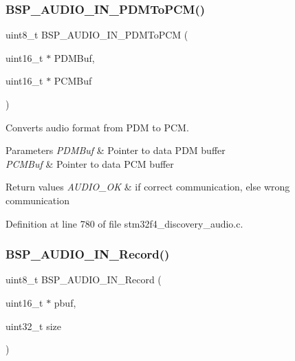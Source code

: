 \subsubsection{\texorpdfstring{B\+S\+P\+\_\+\+A\+U\+D\+I\+O\+\_\+\+I\+N\+\_\+\+P\+D\+M\+To\+P\+C\+M()}{BSP\_AUDIO\_IN\_PDMToPCM()}}
{\footnotesize\ttfamily uint8\+\_\+t B\+S\+P\+\_\+\+A\+U\+D\+I\+O\+\_\+\+I\+N\+\_\+\+P\+D\+M\+To\+P\+CM (\begin{DoxyParamCaption}\item[{uint16\+\_\+t $\ast$}]{P\+D\+M\+Buf,  }\item[{uint16\+\_\+t $\ast$}]{P\+C\+M\+Buf }\end{DoxyParamCaption})}



Converts audio format from P\+DM to P\+CM. 


\begin{DoxyParams}{Parameters}
{\em P\+D\+M\+Buf} & Pointer to data P\+DM buffer \\
\hline
{\em P\+C\+M\+Buf} & Pointer to data P\+CM buffer \\
\hline
\end{DoxyParams}

\begin{DoxyRetVals}{Return values}
{\em A\+U\+D\+I\+O\+\_\+\+OK} & if correct communication, else wrong communication \\
\hline
\end{DoxyRetVals}


Definition at line 780 of file stm32f4\+\_\+discovery\+\_\+audio.\+c.

\mbox{\label{group___s_t_m32_f4___d_i_s_c_o_v_e_r_y___a_u_d_i_o___i_n___private___functions_gad09c12263c075c5e26b28e4380468c9e}} 
\subsubsection{\texorpdfstring{B\+S\+P\+\_\+\+A\+U\+D\+I\+O\+\_\+\+I\+N\+\_\+\+Record()}{BSP\_AUDIO\_IN\_Record()}}
{\footnotesize\ttfamily uint8\+\_\+t B\+S\+P\+\_\+\+A\+U\+D\+I\+O\+\_\+\+I\+N\+\_\+\+Record (\begin{DoxyParamCaption}\item[{uint16\+\_\+t $\ast$}]{pbuf,  }\item[{uint32\+\_\+t}]{size }\end{DoxyParamCaption})}



